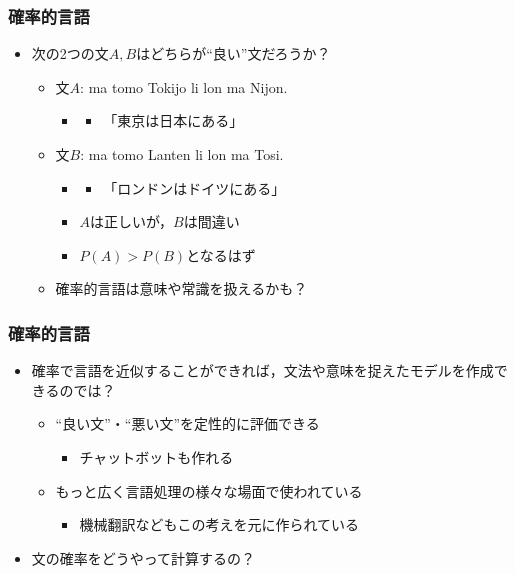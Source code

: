 \documentclass[14pt]{beamer}
\begin{document}
\begin{frame}
	\frametitle{確率的言語}

	\begin{itemize}
		\item 次の2つの文$A, B$はどちらが``良い''文だろうか？
			\begin{itemize}
				\item 文$A$: ma tomo Tokijo li lon ma Nijon.
					\begin{itemize}
						\item[]
							\begin{itemize}
								\item 「東京は日本にある」
							\end{itemize}
					\end{itemize}
				\item 文$B$: ma tomo Lanten li lon ma Tosi.
					\begin{itemize}
						\item[]
							\begin{itemize}
								\item 「ロンドンはドイツにある」
							\end{itemize}
					\end{itemize}
					\begin{itemize}
						\item $A$は正しいが，$B$は間違い
						\item $P(A) > P(B)$となるはず
					\end{itemize}
				\item 確率的言語は\alert{意味や常識を扱える}かも？
			\end{itemize}
	\end{itemize}
\end{frame}

\begin{frame}
	\frametitle{確率的言語}

	\begin{itemize}
		\item \alert{確率で言語を近似}することができれば，文法や意味を捉えたモデルを作成できるのでは？
			\begin{itemize}
				\item ``良い文''・``悪い文''を定性的に評価できる
					\begin{itemize}
						\item チャットボットも作れる
					\end{itemize}
				\item もっと広く言語処理の様々な場面で使われている
					\begin{itemize}
						\item 機械翻訳などもこの考えを元に作られている
					\end{itemize}
			\end{itemize}
		\item 文の確率をどうやって計算するの？
	\end{itemize}
\end{frame}
\end{document}
